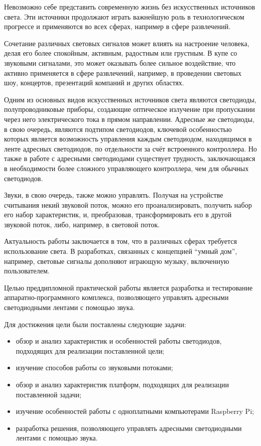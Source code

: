 \intro

Невозможно себе представить современную жизнь без искусственных источников света. Эти источники продолжают играть важнейшую роль в технологическом прогрессе и применяются во всех сферах, например в сфере развлечений.

Сочетание различных световых сигналов может влиять на настроение человека, делая его более спокойным, активным, радостным или грустным. В купе со звуковыми сигналами, это может оказывать более сильное воздействие, что активно применяется в сфере развлечений, например, в проведении световых шоу, концертов, презентаций компаний и других областях.

Одним из основных видов искусственных источников света являются светодиоды, полупроводниковые приборы, создающие оптическое излучение при пропускании через него электрического тока в прямом направлении. Адресные же светодиоды, в свою очередь, являются подтипом светодиодов, ключевой особенностью которых является возможность управления каждым светодиодом, находящимся в ленте адресных светодиодов, по отдельности за счёт встроенного контроллера. Но также в работе с адресными светодиодами существует трудность, заключающаяся в необходимости более сложного управляющего контроллера, чем для обычных светодиодов.

Звуки, в свою очередь, также можно управлять. Получая на устройстве считывания некий звуковой поток, можно его проанализировать, получить набор его набор характеристик, и, преобразовав, трансформировать его в другой звуковой поток, либо, например, в световой поток.

Актуальность работы заключается в том, что в различных сферах требуется использование света. В разработках, связанных с концепцией ``умный дом'', например, световые сигналы дополняют играющую музыку, включенную пользователем.

Целью преддипломной практической работы является разработка и тестирование аппаратно-программного комплекса, позволяющего управлять адресными светодиодными лентами с помощью звука.

Для достижения цели были поставлены следующие задачи:

\begin{itemize}
  \item обзор и анализ характеристик и особенностей работы светодиодов, подходящих для реализации поставленной цели;
  \item изучение способов работы со звуковыми потоками;
  \item обзор и анализ характеристик платформ, подходящих для реализации поставленной задачи;
  \item изучение особенностей работы с одноплатными компьютерами Raspberry Pi;
  \item разработка решения, позволяющего управлять адресными светодиодными лентами с помощью звука.
\end{itemize}